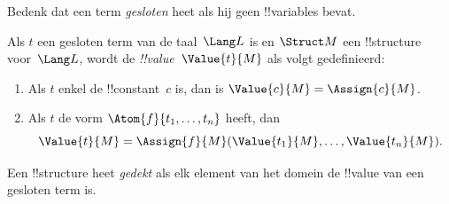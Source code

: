 \documentclass[openany]{memoir}
\begin{document}


\begin{explain}
Bedenk dat een term \emph{gesloten} heet als hij geen !!{variable}s bevat.
\end{explain}

\begin{defn}
Als $t$ een gesloten term van de taal~$\Lang L$ is en $\Struct M$ een
!!{structure} voor~$\Lang L$, wordt de \emph{!!{value}}~$\Value{t}{M}$
als volgt gedefinieerd:
\begin{enumerate}
\item Als $t$ enkel de !!{constant}~$c$ is, dan is $\Value{c}{M} = \Assign{c}{M}$.
\item Als $t$ de vorm $\Atom{f}{t_1, \ldots, t_n}$ heeft, dan
  \[
  \Value{t}{M} = \Assign{f}{M}(\Value{t_1}{M}, \ldots,
  \Value{t_n}{M}).
  \]
\end{enumerate}
\end{defn}

\begin{defn}
Een !!{structure} heet \emph{gedekt} als elk element van het domein de
!!{value} van een gesloten term is.
\end{defn}
\end{document}
